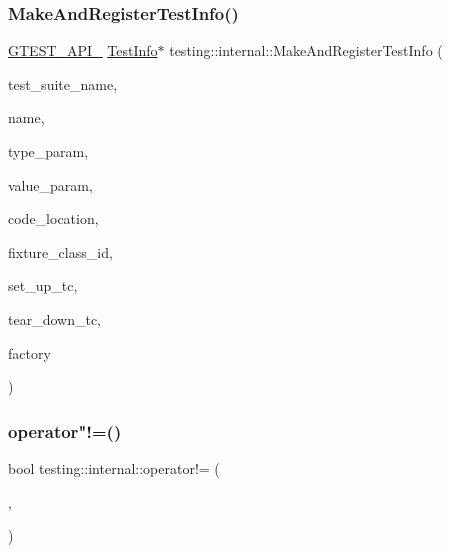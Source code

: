 \subsubsection{\texorpdfstring{Make\+And\+Register\+Test\+Info()}{MakeAndRegisterTestInfo()}}
{\footnotesize\ttfamily \hyperlink{gtest-port_8h_aa73be6f0ba4a7456180a94904ce17790}{G\+T\+E\+S\+T\+\_\+\+A\+P\+I\+\_\+} \hyperlink{classtesting_1_1TestInfo}{Test\+Info}$\ast$ testing\+::internal\+::\+Make\+And\+Register\+Test\+Info (\begin{DoxyParamCaption}\item[{const char $\ast$}]{test\+\_\+suite\+\_\+name,  }\item[{const char $\ast$}]{name,  }\item[{const char $\ast$}]{type\+\_\+param,  }\item[{const char $\ast$}]{value\+\_\+param,  }\item[{\hyperlink{structtesting_1_1internal_1_1CodeLocation}{Code\+Location}}]{code\+\_\+location,  }\item[{\hyperlink{namespacetesting_1_1internal_ab1114197d3c657d8b7f8e0c5caa12d00}{Type\+Id}}]{fixture\+\_\+class\+\_\+id,  }\item[{\hyperlink{namespacetesting_1_1internal_a83e4e0732ac6a9dcfe6ee299dc1b9fa2}{Set\+Up\+Test\+Suite\+Func}}]{set\+\_\+up\+\_\+tc,  }\item[{\hyperlink{namespacetesting_1_1internal_a8257a87aa42cebaa54b0c48a6ae657a5}{Tear\+Down\+Test\+Suite\+Func}}]{tear\+\_\+down\+\_\+tc,  }\item[{\hyperlink{classtesting_1_1internal_1_1TestFactoryBase}{Test\+Factory\+Base} $\ast$}]{factory }\end{DoxyParamCaption})}

\mbox{\label{namespacetesting_1_1internal_afa44fdec84edfc155ef63e4f0d4287cc}} 
\subsubsection{\texorpdfstring{operator"!=()}{operator!=()}}
{\footnotesize\ttfamily bool testing\+::internal\+::operator!= (\begin{DoxyParamCaption}\item[{\hyperlink{structtesting_1_1internal_1_1faketype}{faketype}}]{,  }\item[{\hyperlink{structtesting_1_1internal_1_1faketype}{faketype}}]{ }\end{DoxyParamCaption})\hspace{0.3cm}{\ttfamily [inline]}}

